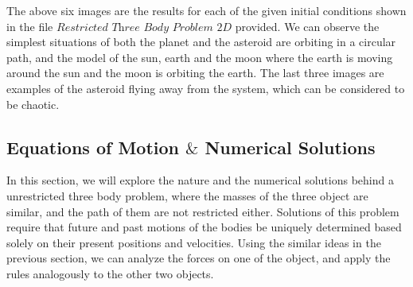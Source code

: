 The above six images are the results for each of the given initial conditions shown in the file $\textit{Restricted Three Body Problem 2D}$ provided. We can observe the simplest situations of both the planet and the asteroid are orbiting in a circular path, and the model of the sun, earth and the moon where the earth is moving around the sun and the moon is orbiting the earth. The last three images are examples of the asteroid flying away from the system, which can be considered to be chaotic.



\subsection{Equations of Motion $\&$ Numerical Solutions}

In this section, we will explore the nature and the numerical solutions behind a unrestricted three body problem, where the masses of the three object are similar, and the path of them are not restricted either. Solutions of this problem require that future and past motions of the bodies be uniquely determined based solely on their present positions and velocities. Using the similar ideas in the previous section, we can analyze the forces on one of the object, and apply the rules analogously to the other two objects.

